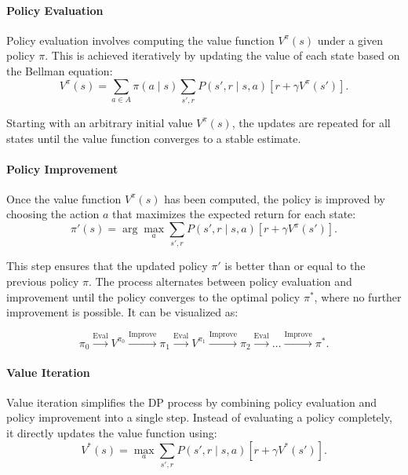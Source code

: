 \paragraph{Policy Evaluation}
Policy evaluation involves computing the value function \( V^\pi(s) \) under a
given policy \( \pi \). This is achieved iteratively by updating the value of
each state based on the Bellman equation:
\begin{equation}
    V^\pi(s) = \sum_{a \in A} \pi(a \mid s) \sum_{s', r} P(s', r \mid s, a) \left[ r + \gamma V^\pi(s') \right].
\end{equation}

Starting with an arbitrary initial value \( V^\pi(s) \), the updates are
repeated for all states until the value function converges to a stable
estimate\cite{bg2}.

\paragraph{Policy Improvement}
Once the value function \( V^\pi(s) \) has been computed, the policy is
improved by choosing the action \( a \) that maximizes the expected return for
each state:
\begin{equation}
    \pi'(s) = \arg\max_a \sum_{s', r} P(s', r \mid s, a) \left[ r + \gamma V^\pi(s') \right].
\end{equation}

This step ensures that the updated policy \( \pi' \) is better than or equal to
the previous policy \( \pi \). The process alternates between policy evaluation
and improvement until the policy converges to the optimal policy \( \pi^* \),
where no further improvement is possible. It can be visualized as:

\[
    \pi_0 \xrightarrow{\text{Eval}} V^{\pi_0} \xrightarrow{\text{Improve}} \pi_1 \xrightarrow{\text{Eval}} V^{\pi_1} \xrightarrow{\text{Improve}} \pi_2 \xrightarrow{\text{Eval}} \ldots \xrightarrow{\text{Improve}} \pi^*.
\]

\paragraph{Value Iteration}
Value iteration simplifies the DP process by combining policy evaluation and
policy improvement into a single step. Instead of evaluating a policy
completely, it directly updates the value function using:
\begin{equation}
    V^*(s) = \max_a \sum_{s', r} P(s', r \mid s, a) \left[ r + \gamma V^*(s') \right].
\end{equation}

